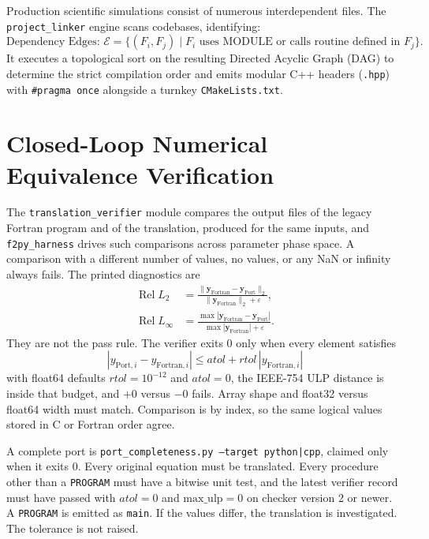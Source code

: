 \documentclass[11pt,a4paper]{article}
\theoremstyle{definition}
\begin{document}
Production scientific simulations consist of numerous interdependent files. The \texttt{project\_linker} engine scans codebases, identifying:
\begin{equation}
    \text{Dependency Edges: } \mathcal{E} = \{ (F_i, F_j) \mid F_i \text{ uses MODULE or calls routine defined in } F_j \}.
\end{equation}
It executes a topological sort on the resulting Directed Acyclic Graph (DAG) to determine the strict compilation order and emits modular C++ headers (\texttt{.hpp}) with \texttt{\#pragma once} alongside a turnkey \texttt{CMakeLists.txt}.

\section{Closed-Loop Numerical Equivalence Verification}

The \texttt{translation\_verifier} module compares the output files of the legacy Fortran program and of the translation, produced for the same inputs, and \texttt{f2py\_harness} drives such comparisons across parameter phase space. A comparison with a different number of values, no values, or any NaN or infinity always fails. The printed diagnostics are
\begin{align}
    \operatorname{Rel } L_2 &= \frac{\|\mathbf{y}_{\mathrm{Fortran}} - \mathbf{y}_{\mathrm{Port}}\|_2}{\|\mathbf{y}_{\mathrm{Fortran}}\|_2 + \varepsilon}, \\
    \operatorname{Rel } L_\infty &= \frac{\max |\mathbf{y}_{\mathrm{Fortran}} - \mathbf{y}_{\mathrm{Port}}|}{\max |\mathbf{y}_{\mathrm{Fortran}}| + \varepsilon}.
\end{align}
They are not the pass rule. The verifier exits 0 only when every element satisfies
\begin{equation}
    |y_{\mathrm{Port}, i} - y_{\mathrm{Fortran}, i}| \le atol + rtol\,|y_{\mathrm{Fortran}, i}|
\end{equation}
with float64 defaults $rtol = 10^{-12}$ and $atol = 0$, the IEEE-754 ULP distance is inside that budget, and $+0$ versus $-0$ fails. Array shape and float32 versus float64 width must match. Comparison is by index, so the same logical values stored in C or Fortran order agree.

A complete port is \texttt{port\_completeness.py --target python|cpp}, claimed only when it exits 0. Every original equation must be translated. Every procedure other than a \texttt{PROGRAM} must have a bitwise unit test, and the latest verifier record must have passed with $atol = 0$ and $\mathrm{max\_ulp} = 0$ on checker version 2 or newer. A \texttt{PROGRAM} is emitted as \texttt{main}. If the values differ, the translation is investigated. The tolerance is not raised.
\end{document}
